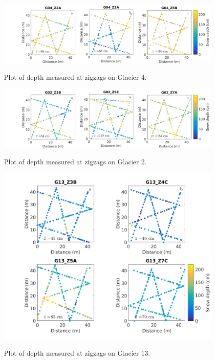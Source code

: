 \documentclass[12pt]{article}
\begin{document}
\begin{landscape}
\begin{figure}
	\includegraphics[width = 20 cm]{ZigzagDepth_G04.png}\\
	\caption{Plot of depth measured at zigzags on Glacier 4.}
	\label{fig:ZZ_G04}
\end{figure}

\begin{figure}
	\centering
	\includegraphics[width = 20 cm]{ZigzagDepth_G02.png}\\
	\caption{Plot of depth measured at zigzags on Glacier 2.}
	\label{fig:ZZ_G02}
\end{figure}
\end{landscape}
{
\begin{figure} 
	\centering
	\includegraphics[width = \textwidth]{ZigzagDepth_G13.png}\\
	\caption{Plot of depth measured at zigzags on Glacier 13.}
	\label{fig:ZZ_G13}
\end{figure}
}
\end{document}
